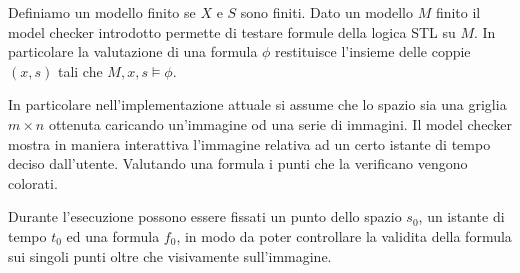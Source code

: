 \documentclass[a4paper,11pt]{article}
\renewcommand{\(}{\left(}
\renewcommand{\)}{\right)}
\newcommand{\<}{\textlangle}
\renewcommand{\>}{\textrangle}
\begin{document}
Definiamo un modello finito se $X$ e $S$ sono finiti. Dato un modello $M$ finito il model checker introdotto permette di testare formule della logica STL su $M$. In particolare la valutazione di una formula $\phi$ restituisce l'insieme delle coppie $(x,s)$ tali che $M,x,s\vDash \phi$.

In particolare nell'implementazione attuale si assume che lo spazio sia una griglia $m \times n$ ottenuta caricando un'immagine od una serie di immagini. Il model checker mostra in maniera interattiva l'immagine relativa ad un certo istante di tempo deciso dall'utente. Valutando una formula i punti che la verificano vengono colorati.

Durante l'esecuzione possono essere fissati un punto dello spazio $s_0$, un istante di tempo $t_0$ ed una formula $f_0$, in modo da poter controllare la validita della formula sui singoli punti oltre che visivamente sull'immagine.
\end{document}

